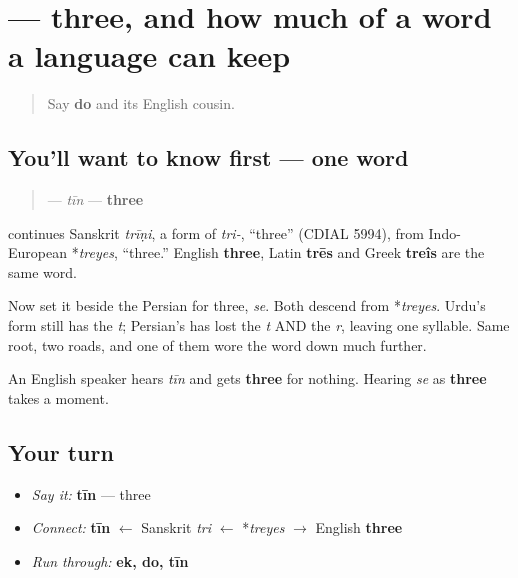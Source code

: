 \section[\texorpdfstring{\ur{تین} (tīn)}{تین (tīn)}]{ — three, and how much of a word a language can keep}

\label{lesson:UR-C28-teen}



\begin{quote}
Say \textbf{do} and its English cousin.
\end{quote}

\subsection*{You'll want to know first — one word}
\begin{quote}
\textbf{} — \emph{tīn} — \textbf{three}
\end{quote}

\begin{cousinweb}
\textbf{} continues Sanskrit \emph{trīṇi}, a form of \emph{tri-}, \textquotedblleft{}three\textquotedblright{} (CDIAL 5994), from Indo-European *\emph{treyes}, \textquotedblleft{}three.\textquotedblright{} English \textbf{three}, Latin \textbf{trēs} and Greek \textbf{treîs} are the same word.

Now set it beside the Persian for three, \emph{se}. Both descend from *\emph{treyes}. Urdu's form still has the \emph{t}; Persian's has lost the \emph{t} AND the \emph{r}, leaving one syllable. Same root, two roads, and one of them wore the word down much further.

An English speaker hears \emph{tīn} and gets \textbf{three} for nothing. Hearing \emph{se} as \textbf{three} takes a moment.
\end{cousinweb}

\subsection*{Your turn}
\begin{itemize}
\raggedright
  \item \emph{Say it:} \textbf{tīn} — three
  \item \emph{Connect:} \textbf{tīn} $\leftarrow$ Sanskrit \emph{tri} $\leftarrow$ *\emph{treyes} $\to$ English \textbf{three}
  \item \emph{Run through:} \textbf{ek, do, tīn}
\end{itemize}

